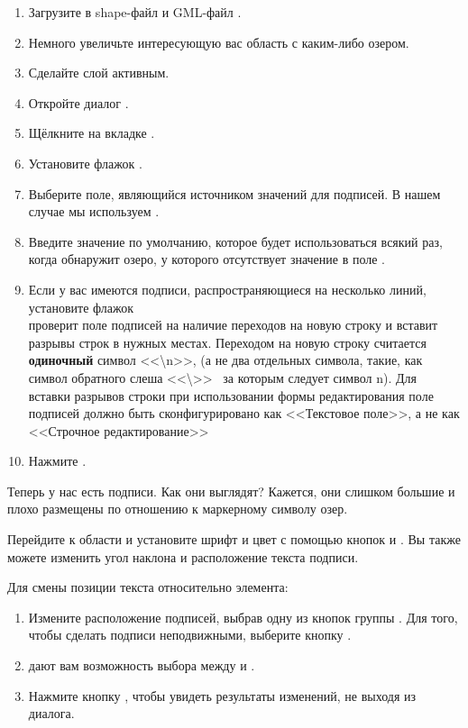 \begin{enumerate}
\item Загрузите в \qg shape-файл  и GML-файл .
\item Немного увеличьте интересующую вас область с каким-либо озером.
\item Сделайте слой  активным.
\item Откройте диалог .
\item Щёлкните на вкладке .
\item Установите флажок .
\item Выберите поле, являющийся источником значений для подписей. В нашем
случае мы используем .
\item Введите значение по умолчанию, которое будет использоваться всякий
раз, когда \qg обнаружит озеро, у которого отсутствует значение в поле
.
\item Если у вас имеются подписи, распространяющиеся на несколько линий,
установите флажок \\
 \qg проверит поле подписей на
наличие переходов на новую строку и вставит разрывы строк в нужных местах.
Переходом на новую строку считается \textbf{одиночный} символ <<\textbackslash n>>,
(а не два отдельных символа, такие, как символ обратного слеша <<\textbackslash >>
~за которым следует символ n). Для вставки разрывов строки при использовании
формы редактирования поле подписей должно быть сконфигурировано как <<Текстовое
поле>>, а не как <<Строчное редактирование>>
\item Нажмите .
\end{enumerate}

Теперь у нас есть подписи. Как они выглядят? Кажется, они слишком большие
и плохо размещены по отношению к маркерному символу озер.

Перейдите к области  и установите шрифт и цвет с помощью кнопок
 и . Вы также можете изменить угол наклона и
расположение текста подписи.

Для смены позиции текста относительно элемента:

\begin{enumerate}
\item Измените расположение подписей, выбрав одну из кнопок группы .
Для того, чтобы сделать подписи неподвижными, выберите кнопку .
\item {} дают вам возможность
выбора между  и .
\item Нажмите кнопку , чтобы увидеть результаты
изменений, не выходя из диалога.
\end{enumerate}

